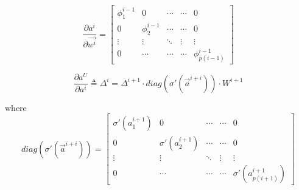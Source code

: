 \begin{equation}
\frac{\partial a^i}{\partial \vec{w^i}} =
 \begin{bmatrix}
   \phi_1^{i-1}    & 0                & \cdots      & \cdots       & 0  \\
   0               & \phi_2^{i-1}     & \cdots      & \cdots       & 0  \\
   \vdots          & \vdots           & \ddots      & \vdots       &\vdots\\
   0               & \cdots           & \cdots      & \cdots       & \phi^{i-1}_{p(i-1)}
\end{bmatrix}
\end{equation}

\begin{equation}
\frac{\partial a^U}{\partial a^i} \triangleq \Delta^i = \Delta^{i+1} \cdot diag(\sigma'(\vec{a}^{i+i})) \cdot W^{i+1}
\end{equation}

where
\begin{equation}
diag(\sigma'(\vec{a}^{i+i})) =
 \begin{bmatrix}
   \sigma'(a^{i+1}_1)    & 0                & \cdots      & \cdots       & 0  \\
   0                     & \sigma'(a^{i+1}_2)     & \cdots      & \cdots       & 0  \\
   \vdots                & \vdots           & \ddots      & \vdots       &\vdots\\
   0                     & \cdots           & \cdots      & \cdots       &\sigma'(a^{i+1}_{p(i+1)})
\end{bmatrix}
\end{equation}
